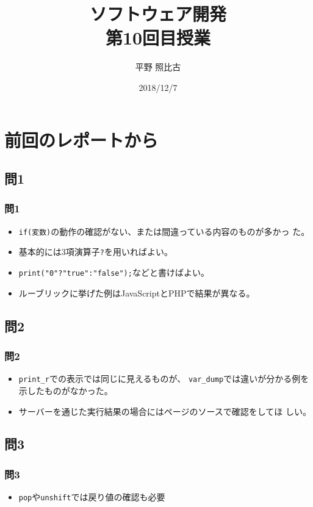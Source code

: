 
\title{ソフトウェア開発\\第10回目授業}
\author{平野 照比古}
\institute{}
\date{2018/12/7}
\newtheorem{Prob}{解説}
\newcommand{\Elm}[1]{\texttt{<#1>}}

\newcommand{\DOMM}{\texttt}
\newcommand{\Event}{\texttt}
\newcommand{\DOMP}{\texttt}
\newcommand{\DOM}{\texttt{DOM}}
\newcommand{\keyitem}{\relax}
\newcommand{\HTML}{HTML文書}

\frame{\maketitle}
\section{前回のレポートから}
 \subsection{問1}
 \begin{frame}[containsverbatim]
  \frametitle{問1}
 \begin{itemize}
	\item \texttt{if(変数)}の動作の確認がない、または間違っている内容のものが多かっ
た。
  \item 基本的には3項演算子\texttt{?}を用いればよい。
	\item \Verb+print("0"?"true":"false");+などと書けばよい。
	\item ルーブリックに挙げた例はJavaScriptとPHPで結果が異なる。
	\end{itemize}
 \end{frame}
 \subsection{問2}
 \begin{frame}[containsverbatim]
  \frametitle{問2}
  \begin{itemize}
   \item \texttt{print\_r}での表示では同じに見えるものが、
         \texttt{var\_dump}では違いが分かる例を示したものがなかった。
   \item サーバーを通じた実行結果の場合にはページのソースで確認をしてほ
         しい。
  \end{itemize}
 \end{frame}
 \subsection{問3}
 \begin{frame}[containsverbatim]
  \frametitle{問3}
  \begin{itemize}
   \item \texttt{pop}や\texttt{unshift}では戻り値の確認も必要
  \end{itemize}
 \end{frame}

